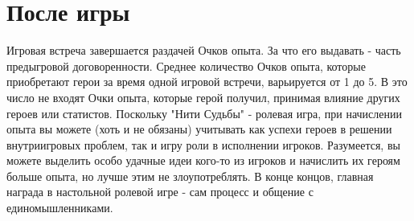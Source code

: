 \section{После игры}
Игровая встреча завершается раздачей Очков опыта. За что его выдавать - часть предыгровой договоренности. Среднее количество Очков опыта, которые приобретают герои за время одной игровой встречи, варьируется от 1 до 5. В это число не входят Очки опыта, которые герой получил, принимая влияние других героев или статистов.
\newline
Поскольку "Нити Судьбы" - ролевая игра, при начислении опыта вы можете (хоть и не обязаны) учитывать как успехи героев в решении внутриигровых проблем, так и игру роли в исполнении игроков.
\newline
Разумеется, вы можете выделить особо удачные идеи кого-то из игроков и начислить их героям больше опыта, но лучше этим не злоупотреблять. В конце концов, главная награда в настольной ролевой игре - сам процесс и общение с единомышленниками.